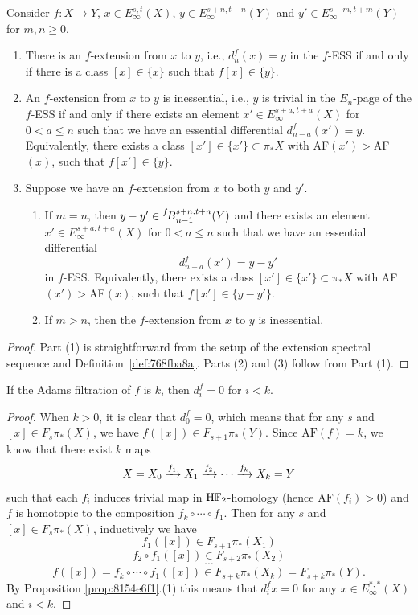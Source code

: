 \documentclass{amsart}
\numberwithin{equation}{section}
\newcommand{\AF}{\mathrm{AF}}
\newcommand{\BESS}[1]{\prescript{#1\!}{}{B}}
\newcommand{\HF}{\mathrm{H}\bF_2}
\begin{document}
\begin{proposition}\label{prop:8154e6f1}
Consider $f: X\to Y$, $x\in E_\infty^{s,t}(X)$, $y\in E_\infty^{s+n,t+n}(Y)$ and $y'\in E_\infty^{s+m,t+m}(Y)$ for $m,n\ge 0$.
\begin{enumerate}
    \item There is an $f$-extension from $x$ to $y$, i.e., $d_n^{f}(x)=y$ in the $f$-ESS if and only if there is a class $[x]\in \{x\}$ such that $f[x]\in \{y\}$.
    \item An $f$-extension from $x$ to $y$ is inessential, i.e., $y$ is trivial in the $E_n$-page of the $f$-ESS if and only if there exists an element $x'\in E_\infty^{s+a,t+a}(X)$ for $0<a\le n$ such that we have an essential differential $d_{n-a}^{f}(x')=y$. Equivalently, there exists a class $[x'] \in \{x'\} \subset \pi_*X$ with AF$(x')>$AF$(x)$, such that $f[x'] \in \{y\}$.
    
    \item Suppose we have an $f$-extension from $x$ to both $y$ and $y'$.
    \begin{enumerate}
        \item If $m=n$, then $y-y'\in \BESS{f}^{s+n,t+n}_{n-1}(Y)$ and there exists an element $x'\in E_\infty^{s+a,t+a}(X)$ for $0<a\le n$ such that we have an essential differential 
        $$d_{n-a}^{f}(x') = y-y'$$
        in $f$-ESS. Equivalently, there exists a class $[x'] \in \{x'\} \subset \pi_*X$ with AF$(x')>$AF$(x)$, such that $f[x'] \in \{y-y'\}$. 
        \item If $m>n$, then the $f$-extension from $x$ to $y$ is inessential.
     \end{enumerate}
\end{enumerate}
\end{proposition}

\begin{proof}
    Part (1) is straightforward from the setup of the extension spectral sequence and Definition~\ref{def:768fba8a}. Parts (2) and (3) follow from Part (1).
\end{proof}

\begin{corollary}
    If the Adams filtration of $f$ is $k$, then
    $d^f_i=0$ for $i<k$.
\end{corollary}

\begin{proof}
    When $k>0$, it is clear that $d^f_0=0$, which means that for any $s$ and $[x]\in F_s\pi_*(X)$, we have $f([x])\in F_{s+1}\pi_*(Y)$. Since $\AF(f)=k$, we know that there exist $k$ maps
    $$X=X_0\xrightarrow{f_1}X_1\xrightarrow{f_2}\cdots\xrightarrow{f_k}X_k=Y$$
    such that each $f_i$ induces trivial map in $\HF$-homology (hence $\AF(f_i)>0$) and $f$ is homotopic to the composition $f_k\circ \cdots\circ f_1.$
    Then for any $s$ and $[x]\in F_s\pi_*(X)$, inductively we have
    $$f_1([x])\in F_{s+1}\pi_*(X_1)$$
    $$f_2\circ f_1([x])\in F_{s+2}\pi_*(X_2)$$
    $$\cdots$$
    $$f([x])=f_k\circ\cdots\circ f_1([x])\in F_{s+k}\pi_*(X_k)=F_{s+k}\pi_*(Y).$$
    By Proposition \ref{prop:8154e6f1}.(1) this means that $d_i^fx=0$ for any $x\in E_\infty^{*,*}(X)$ and $i<k$.
\end{proof}
\end{document}
